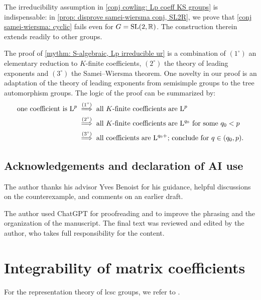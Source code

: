 \documentclass[a4paper, 10pt]{article}
\begin{document}
    The irreducibility assumption in \autoref{conj cowling: Lp coeff KS groups} is indispensable: in \autoref{prop: disprove samei-wiersma conj, SL2R}, we prove that \autoref{conj samei-wiersma: cyclic} fails even for $G=\operatorname{SL}(2,\mathbb{R})$. The construction therein extends readily to other groups.

    The proof of \autoref{mythm: S-algebraic, Lp irreducible ur} is a combination of $(1^\circ)$ an elementary reduction to $K$-finite coefficients, $(2^\circ)$ the theory of leading exponents and $(3^\circ)$ the Samei--Wiersma theorem. 
    One novelty in our proof is an adaptation of the theory of leading exponents from semisimple groups to the tree automorphism groups.
    The logic of the proof can be summarized by:
    \begin{align*}
        \text{one coefficient is $\mathrm{L}^p$} &\overset{(1^\circ)}{\implies} \text{all $K$-finite coefficients are $\mathrm{L}^p$} \\
        & \overset{(2^\circ)}{\implies}
        \text{all $K$-finite coefficients are $\mathrm{L}^{q_0}$ for some $q_0<p$}\\
        & \overset{(3^\circ)}{\implies}\text{all coefficients are $\mathrm{L}^{q_0+}$; conclude for $q\in(q_0,p)$.}
    \end{align*}

    \subsection*{Acknowledgements and declaration of AI use}
    The author thanks his advisor Yves Benoist for his guidance, helpful discussions on the counterexample, and comments on an earlier draft.

    The author used ChatGPT for proofreading and to improve the phrasing and the organization of the manuscript.
    The final text was reviewed and edited by the author, who takes full responsibility for the content.


\section{Integrability of matrix coefficients}\label{sec: int mat coeff}
    For the representation theory of lcsc groups, we refer to \cite{bekka-harpe2020unitary}.
\end{document}
